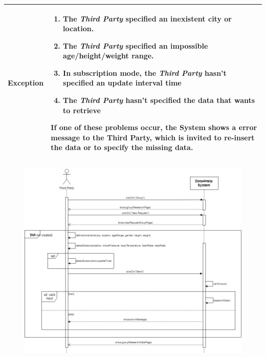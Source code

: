 \begin{table}[H]
\begin{tabular}{|p{3.5cm}|p{10.3cm}|}
    \hline
    \textbf{\large{Exception}} 			& \begin{enumerate}[leftmargin=0.5cm] \item The \emph{Third                                       Party} specified an inexistent city or                                 location.
                                 \item The \emph{Third Party} specified an impossible age/height/weight range.  \item In subscription mode, the \emph{Third Party} hasn't specified an update interval time
                                 \item The \emph{Third Party} hasn't specified the data that wants to retrieve
    \end{enumerate}
    										If one of these problems occur, the System shows a error message to the Third Party, which is invited to re-insert the data or to specify the missing data.
    							
    							\\
    
    \hline
    
    
    \end{tabular}
	
\end{table}
\begin{figure}[H]
    \centering
    \includegraphics[scale=0.4]{rasdL/Pictures/groupResearchSeqDiag.png}
    
\end{figure}
